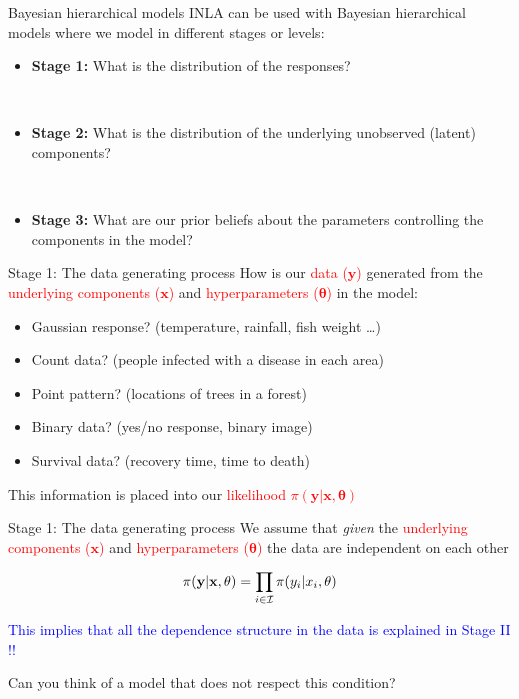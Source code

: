 \documentclass[
  ignorenonframetext,
]{beamer}
\providecommand{\tightlist}{%
  \setlength{\itemsep}{0pt}\setlength{\parskip}{0pt}}
\begin{document}
\begin{frame}{Bayesian hierarchical models}
\protect\hypertarget{bayesian-hierarchical-models-1}{}
INLA can be used with Bayesian hierarchical models where we model in
different stages or levels:

\begin{itemize}
\tightlist
\item
  \textbf{Stage 1:} What is the distribution of the responses?\\
  \strut \\
\item
  \textbf{Stage 2:} What is the distribution of the underlying
  unobserved (latent) components?\\
  \strut \\
\item
  \textbf{Stage 3:} What are our prior beliefs about the parameters
  controlling the components in the model?
\end{itemize}
\end{frame}

\begin{frame}{Stage 1: The data generating process}
\protect\hypertarget{stage-1-the-data-generating-process}{}
How is our \textcolor{red}{data (\(\boldsymbol{y}\))} generated from the
\textcolor{red}{underlying components  (\(\boldsymbol{x}\))} and
\textcolor{red}{hyperparameters (\(\boldsymbol{\theta}\))} in the model:

\begin{itemize}[<+->]
\tightlist
\item
  Gaussian response? (temperature, rainfall, fish weight \ldots)
\item
  Count data? (people infected with a disease in each area)
\item
  Point pattern? (locations of trees in a forest)
\item
  Binary data? (yes/no response, binary image)
\item
  Survival data? (recovery time, time to death)
\end{itemize}

\pause

This information is placed into our
\textcolor{red}{\textcolor{red}{likelihood}
    \(\pi(\boldsymbol{y} | \boldsymbol{x}, \boldsymbol{\theta})\)}
\end{frame}

\begin{frame}{Stage 1: The data generating process}
\protect\hypertarget{stage-1-the-data-generating-process-1}{}
We assume that \emph{given} the
\textcolor{red}{underlying components    (\(\boldsymbol{x}\))} and
\textcolor{red}{hyperparameters (\(\boldsymbol{\theta}\))} the data are
independent on each other

\[
\pi(\mathbf{y}|\mathbf{x},\theta) = \prod_{i\in\cal{I}}\pi(y_i|x_{i},\theta)
\] \pause

\textcolor{blue}{This implies that all the dependence structure in the data is explained in Stage II !!}

\pause

Can you think of a model that does not respect this condition?
\end{frame}
\end{document}
